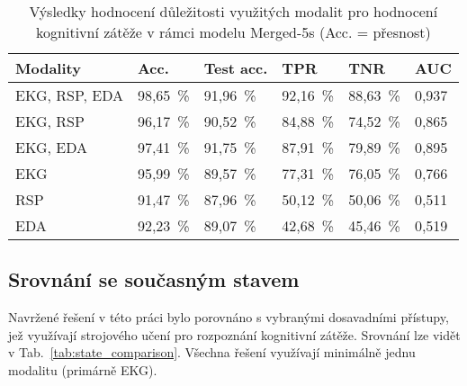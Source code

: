 \begin{table}[h]
    \small
    \centering
    \caption{Výsledky hodnocení důležitosti využitých modalit pro hodnocení
        kognitivní zátěže v rámci modelu Merged-5s (Acc. = přesnost)}
    \begin{tabular*}{\linewidth}{@{\extracolsep{\fill}} llllll @{}}
        \toprule
        Modality            & Acc.     & Test acc. & TPR      & TNR      & AUC   \\ \midrule
        EKG, RSP, EDA       & 98,65~\% & 91,96~\%  & 92,16~\% & 88,63~\% & 0,937 \\
        EKG, RSP            & 96,17~\% & 90,52~\%  & 84,88~\% & 74,52~\% & 0,865 \\
        EKG, EDA            & 97,41~\% & 91,75~\%  & 87,91~\% & 79,89~\% & 0,895 \\
        EKG                 & 95,99~\% & 89,57~\%  & 77,31~\% & 76,05~\% & 0,766 \\
        RSP                 & 91,47~\% & 87,96~\%  & 50,12~\% & 50,06~\% & 0,511 \\
        EDA                 & 92,23~\% & 89,07~\%  & 42,68~\% & 45,46~\% & 0,519 \\
        \bottomrule
    \end{tabular*}
    \label{tab:features}
\end{table}

\subsection{Srovnání se současným stavem}
\label{subsec:state_comparison}
Navržené řešení v této práci bylo porovnáno s vybranými dosavadními přístupy,
jež využívají strojového učení pro rozpoznání kognitivní zátěže. Srovnání lze
vidět v Tab.~\ref{tab:state_comparison}. Všechna řešení využívají minimálně
jednu modalitu (primárně EKG).

